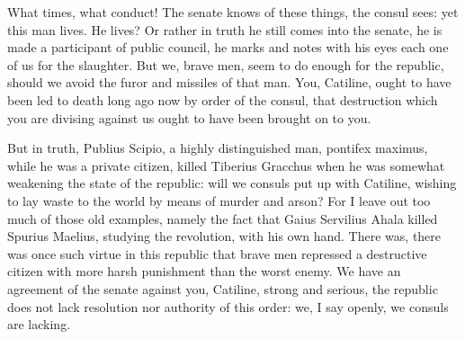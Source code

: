 {  What times, what conduct! The senate knows of these things, the consul sees: yet this man lives. He lives? Or rather in truth he still comes into the senate, he is made a participant of public council, he marks and notes with his eyes each one of us for the slaughter. But we, brave men, seem to do enough for the republic, should we avoid the furor and missiles of that man. You, Catiline, ought to have been led to death long ago now by order of the consul, that destruction which you are divising against us ought to have been brought on to you.

  But in truth, Publius Scipio, a highly distinguished man, pontifex maximus, while he was a private citizen, killed Tiberius Gracchus when he was somewhat weakening the state of the republic: will we consuls put up with Catiline, wishing to lay waste to the world by means of murder and arson? For I leave out too much of those old examples, namely the fact that Gaius Servilius Ahala killed Spurius Maelius, studying the revolution, with his own hand. There was, there was once such virtue in this republic that brave men repressed a destructive citizen with more harsh punishment than the worst enemy. We have an agreement of the senate against you, Catiline, strong and serious, the republic does not lack resolution nor authority of this order: we, I say openly, we consuls are lacking.
}

